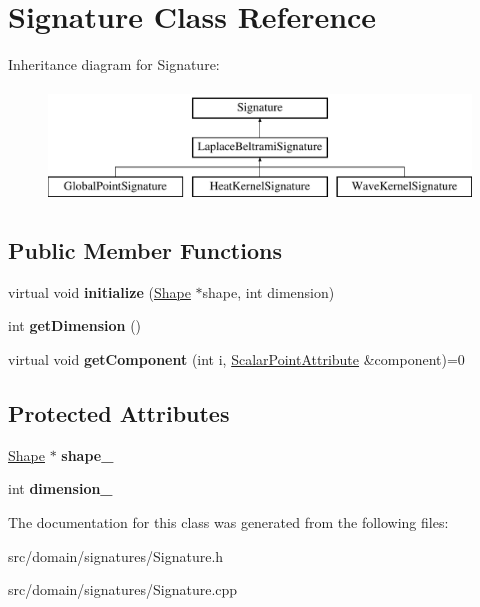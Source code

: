 \hypertarget{class_signature}{}\section{Signature Class Reference}
\label{class_signature}
Inheritance diagram for Signature\+:\begin{figure}[H]
\begin{center}
\leavevmode
\includegraphics[height=3.000000cm]{class_signature}
\end{center}
\end{figure}
\subsection*{Public Member Functions}
\begin{DoxyCompactItemize}
\item 
\hypertarget{class_signature_a015b9f5e9aa2237790dfeadff148e57c}{}virtual void {\bfseries initialize} (\hyperlink{class_shape}{Shape} $\ast$shape, int dimension)\label{class_signature_a015b9f5e9aa2237790dfeadff148e57c}

\item 
\hypertarget{class_signature_a29f25c0b2b0f7b84849306691b52976d}{}int {\bfseries get\+Dimension} ()\label{class_signature_a29f25c0b2b0f7b84849306691b52976d}

\item 
\hypertarget{class_signature_a6f0fdf256e36cf182011f39078d5de28}{}virtual void {\bfseries get\+Component} (int i, \hyperlink{class_scalar_point_attribute}{Scalar\+Point\+Attribute} \&component)=0\label{class_signature_a6f0fdf256e36cf182011f39078d5de28}

\end{DoxyCompactItemize}
\subsection*{Protected Attributes}
\begin{DoxyCompactItemize}
\item 
\hypertarget{class_signature_acf22b05ea577e2bced826e97839f1a01}{}\hyperlink{class_shape}{Shape} $\ast$ {\bfseries shape\+\_\+}\label{class_signature_acf22b05ea577e2bced826e97839f1a01}

\item 
\hypertarget{class_signature_a7cb1a8407ddd441e298b5fc3020b42cb}{}int {\bfseries dimension\+\_\+}\label{class_signature_a7cb1a8407ddd441e298b5fc3020b42cb}

\end{DoxyCompactItemize}


The documentation for this class was generated from the following files\+:\begin{DoxyCompactItemize}
\item 
src/domain/signatures/Signature.\+h\item 
src/domain/signatures/Signature.\+cpp\end{DoxyCompactItemize}
